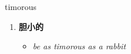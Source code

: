 
\begin{frame}
{\huge timorous}
\begin{center}
\begin{enumerate}\Large
  \item \textbf{胆小的}
  \begin{itemize}
    \item \em{\Large{be as timorous as a rabbit}}
  \end{itemize}
\end{enumerate}
\end{center}
\end{frame}

